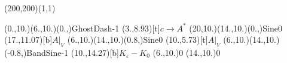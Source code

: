 \unitlength=1bp%

\begin{feynartspicture}(200,200)(1,1)

\FADiagram{}
\FAProp(0.,10.)(6.,10.)(0.,){GhostDash}{-1}
\FALabel(3.,8.93)[t]{$c\to A^*$}
\FAProp(20,10.)(14.,10.)(0.,){Sine}{0}
\FALabel(17.,11.07)[b]{$A|_V$}
\FAProp(6.,10.)(14.,10.)(0.8,){Sine}{0}
\FALabel(10.,5.73)[t]{$A|_V$}
\FAProp(6.,10.)(14.,10.)(-0.8,){BandSine}{-1}
\FALabel(10.,14.27)[b]{$K_\varepsilon-K_0$}
\FAVert(6.,10.){0}
\FAVert(14.,10.){0}
\end{feynartspicture}

